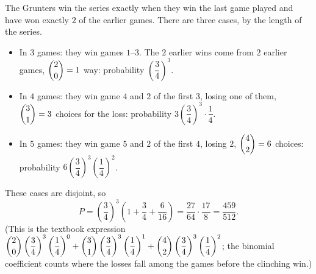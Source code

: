 The Grunters win the series exactly when they win the last game played and have won exactly \(2\) of the earlier games. There are three cases, by the length of the series.
\begin{itemize}
\item In \(3\) games: they win games \(1\)--\(3\). The \(2\) earlier wins come from \(2\) earlier games, \(\dbinom20=1\) way: probability \(\left(\dfrac{3}{4}\right)^3\).
\item In \(4\) games: they win game \(4\) and \(2\) of the first \(3\), losing one of them, \(\dbinom31=3\) choices for the loss: probability \(3\left(\dfrac{3}{4}\right)^3\cdot\dfrac{1}{4}\).
\item In \(5\) games: they win game \(5\) and \(2\) of the first \(4\), losing \(2\), \(\dbinom42=6\) choices: probability \(6\left(\dfrac{3}{4}\right)^3\left(\dfrac{1}{4}\right)^2\).
\end{itemize}
These cases are disjoint, so
\[
P=\left(\dfrac{3}{4}\right)^3\left(1+\dfrac{3}{4}+\dfrac{6}{16}\right)=\dfrac{27}{64}\cdot\dfrac{17}{8}=\boxed{\dfrac{459}{512}}.
\]
(This is the textbook expression \(\dbinom20\left(\dfrac{3}{4}\right)^3\left(\dfrac{1}{4}\right)^0+\dbinom31\left(\dfrac{3}{4}\right)^3\left(\dfrac{1}{4}\right)^1+\dbinom42\left(\dfrac{3}{4}\right)^3\left(\dfrac{1}{4}\right)^2\); the binomial coefficient counts where the losses fall among the games before the clinching win.)
